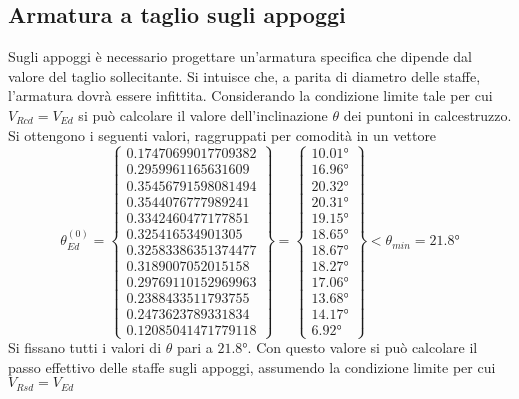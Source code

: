 \subsection{Armatura a taglio sugli appoggi}
Sugli appoggi è necessario progettare un'armatura specifica che dipende dal valore del taglio sollecitante. Si intuisce che, a parita di diametro delle staffe, l'armatura dovrà essere infittita. Considerando la condizione limite tale per cui $V_{Rcd} = V_{Ed}$ si può calcolare il valore dell'inclinazione $\theta$ dei puntoni in calcestruzzo. Si ottengono i seguenti valori, raggruppati per comodità in un vettore
\[
\theta_{Ed}^{(0)} = \begin{Bmatrix}
	0.17470699017709382\\
	0.2959961165631609\\
	0.35456791598081494\\
	0.3544076777989241\\
	0.3342460477177851\\
	0.325416534901305\\
	0.32583386351374477\\
	0.3189007052015158\\
	0.29769110152969963\\
	0.2388433511793755\\
	0.2473623789331834\\
	0.12085041471779118
\end{Bmatrix} =
\begin{Bmatrix}
	\ang{10.01}\\
	\ang{16.96}\\
	\ang{20.32}\\
	\ang{20.31}\\
	\ang{19.15}\\
	\ang{18.65}\\
	\ang{18.67}\\
	\ang{18.27}\\
	\ang{17.06}\\
	\ang{13.68}\\
	\ang{14.17}\\
	\ang{6.92}
\end{Bmatrix} < \theta_{min} = \ang{21.8}
\]
Si fissano tutti i valori di $\theta$ pari a $\ang{21.8}$. Con questo valore si può calcolare il passo effettivo delle staffe sugli appoggi, assumendo la condizione limite per cui $V_{Rsd} = V_{Ed}$
